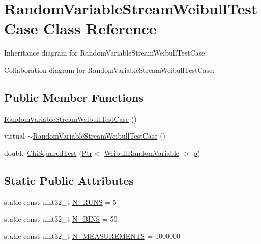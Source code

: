 \hypertarget{classRandomVariableStreamWeibullTestCase}{}\section{Random\+Variable\+Stream\+Weibull\+Test\+Case Class Reference}
\label{classRandomVariableStreamWeibullTestCase}


Inheritance diagram for Random\+Variable\+Stream\+Weibull\+Test\+Case\+:


Collaboration diagram for Random\+Variable\+Stream\+Weibull\+Test\+Case\+:
\subsection*{Public Member Functions}
\begin{DoxyCompactItemize}
\item 
\hyperlink{classRandomVariableStreamWeibullTestCase_a4ccc78f9b2ea9a74bfd378b2ee5415bf}{Random\+Variable\+Stream\+Weibull\+Test\+Case} ()
\item 
virtual \hyperlink{classRandomVariableStreamWeibullTestCase_afe1257564136909219bf84df7937c203}{$\sim$\+Random\+Variable\+Stream\+Weibull\+Test\+Case} ()
\item 
double \hyperlink{classRandomVariableStreamWeibullTestCase_afadfd7f8dc8fdd6423ca1f3a73d83d3e}{Chi\+Squared\+Test} (\hyperlink{classns3_1_1Ptr}{Ptr}$<$ \hyperlink{classns3_1_1WeibullRandomVariable}{Weibull\+Random\+Variable} $>$ \hyperlink{lte__link__budget__x2__handover__measures_8m_ac9de518908a968428863f829398a4e62}{p})
\end{DoxyCompactItemize}
\subsection*{Static Public Attributes}
\begin{DoxyCompactItemize}
\item 
static const uint32\+\_\+t \hyperlink{classRandomVariableStreamWeibullTestCase_a898888ac45565faf424bc30c07cb5131}{N\+\_\+\+R\+U\+NS} = 5
\item 
static const uint32\+\_\+t \hyperlink{classRandomVariableStreamWeibullTestCase_ab240f1ad374ca6d998a4a720c619cc2d}{N\+\_\+\+B\+I\+NS} = 50
\item 
static const uint32\+\_\+t \hyperlink{classRandomVariableStreamWeibullTestCase_a1f058dd1e083f78a0912c228cd1753bc}{N\+\_\+\+M\+E\+A\+S\+U\+R\+E\+M\+E\+N\+TS} = 1000000
\end{DoxyCompactItemize}
